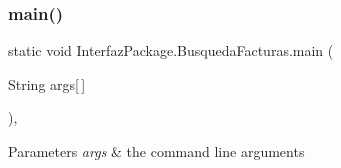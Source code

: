 \subsubsection{\texorpdfstring{main()}{main()}}
{\footnotesize\ttfamily static void Interfaz\+Package.\+Busqueda\+Facturas.\+main (\begin{DoxyParamCaption}\item[{String}]{args\mbox{[}$\,$\mbox{]} }\end{DoxyParamCaption})\hspace{0.3cm}{\ttfamily [inline]}, {\ttfamily [static]}}


\begin{DoxyParams}{Parameters}
{\em args} & the command line arguments \\
\hline
\end{DoxyParams}

